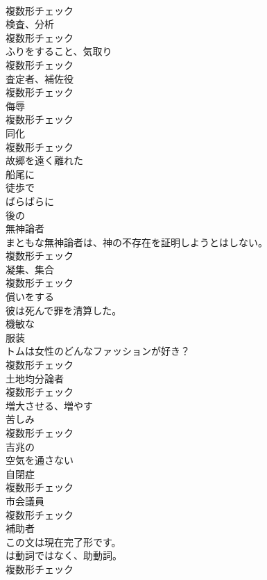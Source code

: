 \documentclass[8pt]{extreport}
\begin{document}
\begin{CJK}{UTF8}{min}
\\	複数形チェック
\\	[名詞]	検査、分析	
\\	複数形チェック
\\	[名詞]	ふりをすること、気取り	
\\	複数形チェック
\\	[名詞]	査定者、補佐役	
\\	複数形チェック
\\	[名詞]	侮辱	
\\	複数形チェック
\\	[名詞]	同化	
\\	複数形チェック
\\	[形容詞]	故郷を遠く離れた	
\\	[副詞]	船尾に	
\\	[形容詞]	徒歩で	
\\	[副詞]	ばらばらに	
\\	[形容詞]	後の	
\\	[名詞]	無神論者	
\\	まともな無神論者は、神の不存在を証明しようとはしない。	
\\	複数形チェック
\\	[名詞]	凝集、集合	
\\	複数形チェック
\\	[動詞]	償いをする	
\\	彼は死んで罪を清算した。	
\\	[形容詞]	機敏な	
\\	[名詞]	服装	
\\	トムは女性のどんなファッションが好き？	
\\	複数形チェック
\\	[名詞]	土地均分論者	
\\	複数形チェック
\\	[動詞]	増大させる、増やす	
\\	[名詞]	苦しみ	
\\	複数形チェック
\\	[形容詞]	吉兆の	
\\	[形容詞]	空気を通さない	
\\	[名詞]	自閉症	
\\	複数形チェック
\\	[名詞]	市会議員	
\\	複数形チェック
\\	[名詞]	補助者	
\\	この文は現在完了形です。
\\	は動詞ではなく、助動詞。	
\\	複数形チェック

\end{CJK}
\end{document}
